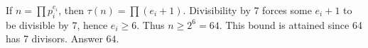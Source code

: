 If $n=\prod p_i^{e_i}$, then $\tau(n)=\prod(e_i+1)$. Divisibility by 7 forces some $e_i+1$ to be divisible by 7, hence $e_i\ge6$. Thus $n\ge2^6=64$. This bound is attained since 64 has 7 divisors. Answer $\boxed{64}$.

